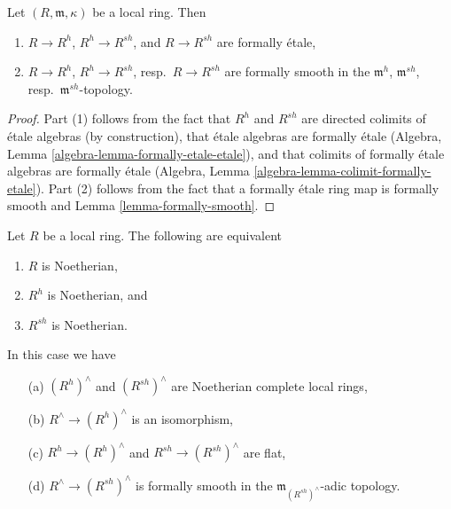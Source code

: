 \begin{lemma}
\label{lemma-henselization-formally-smooth}
Let $(R, \mathfrak m, \kappa)$ be a local ring. Then
\begin{enumerate}
\item $R \to R^h$, $R^h \to R^{sh}$, and $R \to R^{sh}$ are formally \'etale,
\item $R \to R^h$, $R^h \to R^{sh}$, resp.\ $R \to R^{sh}$ are formally
smooth in the $\mathfrak m^h$, $\mathfrak m^{sh}$,
resp.\ $\mathfrak m^{sh}$-topology.
\end{enumerate}
\end{lemma}

\begin{proof}
Part (1) follows from the fact that $R^h$ and $R^{sh}$ are directed
colimits of \'etale algebras (by construction), that \'etale algebras
are formally \'etale
(Algebra, Lemma \ref{algebra-lemma-formally-etale-etale}),
and that colimits of formally \'etale algebras are formally \'etale
(Algebra, Lemma \ref{algebra-lemma-colimit-formally-etale}).
Part (2) follows from the fact that a formally \'etale ring
map is formally smooth and Lemma \ref{lemma-formally-smooth}.
\end{proof}

\begin{lemma}
\label{lemma-henselization-noetherian}
Let $R$ be a local ring. The following are equivalent
\begin{enumerate}
\item $R$ is Noetherian,
\item $R^h$ is Noetherian, and
\item $R^{sh}$ is Noetherian.
\end{enumerate}
In this case we have
\begin{enumerate}
\item[(a)] $(R^h)^\wedge$ and $(R^{sh})^\wedge$ are Noetherian complete
local rings,
\item[(b)] $R^\wedge \to (R^h)^\wedge$ is an isomorphism,
\item[(c)] $R^h \to (R^h)^\wedge$ and $R^{sh} \to (R^{sh})^\wedge$ are flat,
\item[(d)] $R^\wedge \to (R^{sh})^\wedge$ is formally smooth in
the $\mathfrak m_{(R^{sh})^\wedge}$-adic topology.
\end{enumerate}
\end{lemma}

